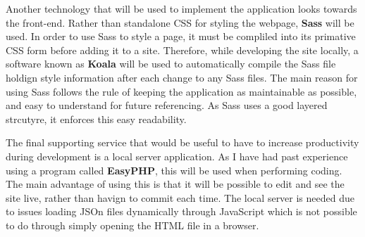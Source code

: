 Another technology that will be used to implement the application looks towards the front-end. Rather than standalone CSS for styling the webpage, \textbf{Sass} will be used. In order to use Sass to style a page, it must be compliled into its primative CSS form before adding it to a site. Therefore, while developing the site locally, a software known as \textbf{Koala} will be used to automatically compile the Sass file holdign style information after each change to any Sass files. The main reason for using Sass follows the rule of keeping the application as maintainable as possible, and easy to understand for future referencing. As Sass uses a good layered strcutyre, it enforces this easy readability.

The final supporting service that would be useful to have to increase productivity during development is a local server application. As I have had past experience using a program called \textbf{EasyPHP}, this will be used when performing coding. The main advantage of using this is that it will be possible to edit and see the site live, rather than havign to commit each time. The local server is needed due to issues loading JSOn files dynamically through JavaScript which is not possible to do through simply opening the HTML file in a browser.